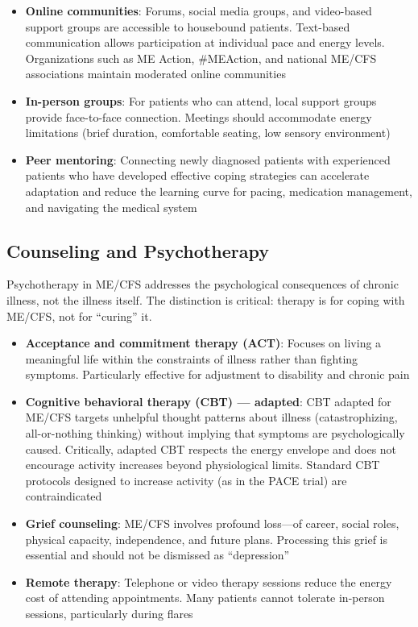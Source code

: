 \begin{itemize}
    \item \textbf{Online communities}: Forums, social media groups, and video-based support groups are accessible to housebound patients. Text-based communication allows participation at individual pace and energy levels. Organizations such as ME Action, \#MEAction, and national ME/CFS associations maintain moderated online communities
    \item \textbf{In-person groups}: For patients who can attend, local support groups provide face-to-face connection. Meetings should accommodate energy limitations (brief duration, comfortable seating, low sensory environment)
    \item \textbf{Peer mentoring}: Connecting newly diagnosed patients with experienced patients who have developed effective coping strategies can accelerate adaptation and reduce the learning curve for pacing, medication management, and navigating the medical system
\end{itemize}

\subsection{Counseling and Psychotherapy}

Psychotherapy in ME/CFS addresses the psychological consequences of chronic illness, not the illness itself. The distinction is critical: therapy is for coping with ME/CFS, not for ``curing'' it.

\begin{itemize}
    \item \textbf{Acceptance and commitment therapy (ACT)}: Focuses on living a meaningful life within the constraints of illness rather than fighting symptoms. Particularly effective for adjustment to disability and chronic pain
    \item \textbf{Cognitive behavioral therapy (CBT) --- adapted}: CBT adapted for ME/CFS targets unhelpful thought patterns about illness (catastrophizing, all-or-nothing thinking) without implying that symptoms are psychologically caused. Critically, adapted CBT respects the energy envelope and does not encourage activity increases beyond physiological limits. Standard CBT protocols designed to increase activity (as in the PACE trial) are contraindicated
    \item \textbf{Grief counseling}: ME/CFS involves profound loss---of career, social roles, physical capacity, independence, and future plans. Processing this grief is essential and should not be dismissed as ``depression''
    \item \textbf{Remote therapy}: Telephone or video therapy sessions reduce the energy cost of attending appointments. Many patients cannot tolerate in-person sessions, particularly during flares
\end{itemize}

